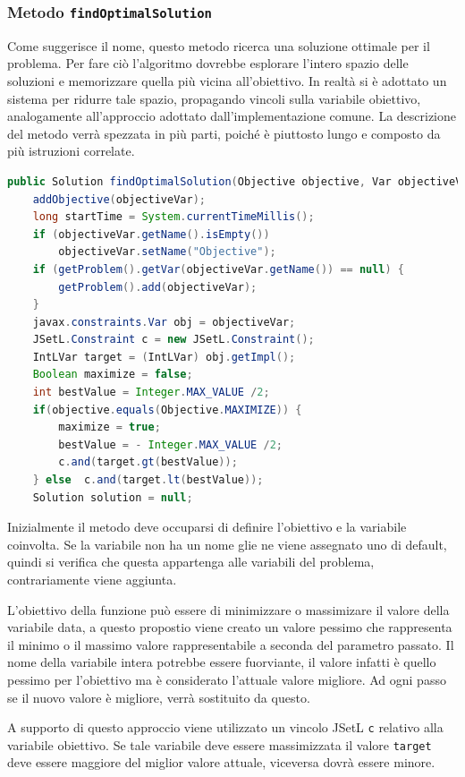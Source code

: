 \subsubsection{Metodo \texttt{findOptimalSolution}}
Come suggerisce il nome, questo metodo ricerca una soluzione ottimale per il
problema. Per fare ciò l'algoritmo dovrebbe esplorare l'intero spazio delle 
soluzioni e memorizzare quella più vicina all'obiettivo. In realtà si è adottato
un sistema per ridurre tale spazio, propagando vincoli sulla
variabile obiettivo, analogamente all'approccio adottato dall'implementazione
comune.
La descrizione del metodo verrà spezzata in più parti, poiché è piuttosto
lungo e composto da più istruzioni correlate.
\begin{lstlisting}[language = Java,
                   caption = {\files{findOptimalSolution}, inizializzazione.}]
public Solution findOptimalSolution(Objective objective, Var objectiveVar) {
	addObjective(objectiveVar);
	long startTime = System.currentTimeMillis();
	if (objectiveVar.getName().isEmpty())
		objectiveVar.setName("Objective"); 
	if (getProblem().getVar(objectiveVar.getName()) == null) {
		getProblem().add(objectiveVar);
	}
	javax.constraints.Var obj = objectiveVar;
	JSetL.Constraint c = new JSetL.Constraint();
	IntLVar target = (IntLVar) obj.getImpl();
	Boolean maximize = false;
	int bestValue = Integer.MAX_VALUE /2;
	if(objective.equals(Objective.MAXIMIZE)) {
		maximize = true;
		bestValue = - Integer.MAX_VALUE /2;
		c.and(target.gt(bestValue));
	} else 	c.and(target.lt(bestValue));
	Solution solution = null;  
\end{lstlisting}
Inizialmente il metodo deve occuparsi di definire l'obiettivo e la variabile
coinvolta. Se la variabile non ha un nome glie ne viene assegnato uno di
default, quindi si verifica che questa appartenga alle
variabili del problema, contrariamente viene aggiunta.

L'obiettivo della funzione può essere di minimizzare o massimizare il valore
della variabile data, a questo propostio viene creato un valore pessimo
 che rappresenta il minimo o il massimo valore
rappresentabile a seconda del parametro  passato. Il nome
della variabile intera 
potrebbe essere fuorviante, il valore infatti è quello pessimo per
l'obiettivo ma è considerato l'attuale valore migliore. Ad ogni passo 
se il nuovo valore  è migliore,  verrà 
sostituito da questo.

A supporto di questo approccio viene utilizzato un vincolo JSetL \texttt{c}
relativo alla variabile obiettivo. Se tale variabile deve essere massimizzata
il valore \texttt{target} deve essere maggiore del miglior valore
attuale, viceversa dovrà essere minore.

